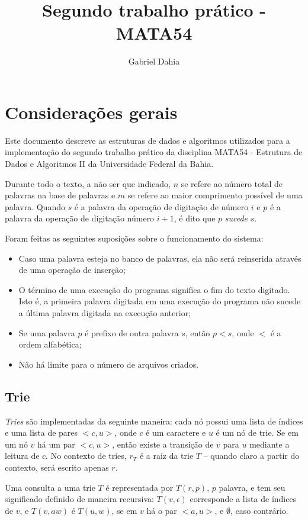 \documentclass[12pt]{article}
\title{Segundo trabalho prático - MATA54}
\author{Gabriel Dahia}
\begin{document}
  \maketitle

  \section{Considerações gerais}
    Este documento descreve as estruturas de dados e algoritmos utilizados para a implementação do segundo trabalho prático da disciplina MATA54 - Estrutura de Dados e Algoritmos II da Universidade Federal da Bahia.

    Durante todo o texto, a não ser que indicado, $n$ se refere ao número total de palavras na base de palavras e $m$ se refere ao maior comprimento possível de uma palavra.
    Quando $s$ é a palavra da operação de digitação de número $i$ e $p$ é a palavra da operação de digitação número $i + 1$, é dito que $p$ \emph{sucede} $s$.

    Foram feitas as seguintes suposições sobre o funcionamento do sistema:
    \begin{itemize}
      \item Caso uma palavra esteja no banco de palavras, ela não será reinserida através de uma operação de inserção;
      \item O término de uma execução do programa significa o fim do texto digitado.
        Isto é, a primeira palavra digitada em uma execução do programa não sucede a última palavra digitada na execução anterior;
      \item Se uma palavra $p$ é prefixo de outra palavra $s$, então $p < s$, onde $<$ é a ordem alfabética;
      \item Não há limite para o número de arquivos criados.
    \end{itemize}

    \subsection{Trie}
    \emph{Tries} são implementadas da seguinte maneira: cada nó possui uma lista de índices e uma lista de pares $<c, u>$, onde $c$ é um caractere e $u$ é um nó de trie.
    Se em um nó $v$ há um par $<c, u>$, então existe a transição de $v$ para $u$ mediante a leitura de $c$. 
    No contexto de tries, $r_T$ é a raiz da trie $T$ -- quando claro a partir do contexto, será escrito apenas $r$. 

    Uma consulta a uma trie $T$ é representada por $T(r, p)$, $p$ palavra, e tem seu significado definido de maneira recursiva: $T(v, \epsilon)$ corresponde a lista de índices de $v$, e $T(v, aw)$ é $T(u, w)$, se em $v$ há o par $<a, u>$, e $\emptyset$, caso contrário.
\end{document}
